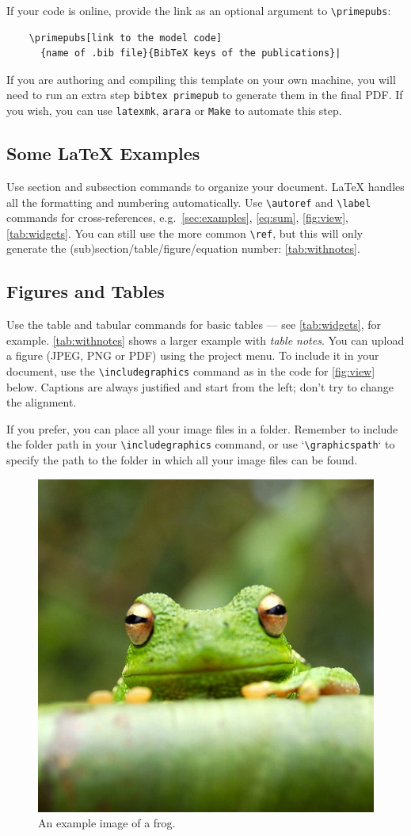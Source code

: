 \documentclass[fleqn,10pt]{physiome}
\begin{document}
If your code is online, provide the link as an optional argument to \verb|\primepubs|:

\begin{verbatim}
    \primepubs[link to the model code]
      {name of .bib file}{BibTeX keys of the publications}|
\end{verbatim}

If you are authoring and compiling this template on your own machine, you will need to run an extra step \verb|bibtex primepub| to generate them in the final PDF. If you wish, you can use \texttt{latexmk}, \texttt{arara} or \texttt{Make} to automate this step.

\subsection{Some \LaTeX{} Examples}
\label{sec:examples}

Use section and subsection commands to organize your document. \LaTeX{} handles all the formatting and numbering automatically. Use \verb|\autoref| and \verb|\label| commands for cross-references, e.g.~\autoref{sec:examples}, \autoref{eq:sum}, \autoref{fig:view}, \autoref{tab:widgets}. You can still use the more common \verb|\ref|, but this will only generate the (sub)section/table/figure/equation number: \ref{tab:withnotes}.

\subsection{Figures and Tables}

Use the table and tabular commands for basic tables --- see \autoref{tab:widgets}, for example. \autoref{tab:withnotes} shows a larger example with \emph{table notes}. You can upload a figure (JPEG, PNG or PDF) using the project menu. To include it in your document, use the \verb|\includegraphics| command as in the code for \autoref{fig:view} below. Captions are always justified and start from the left; don't try to change the alignment.

If you prefer, you can place all your image files in a folder. Remember to include the folder path in your \verb|\includegraphics| command, or use `\verb|\graphicspath|` to specify the path to the folder in which all your image files can be found.

\begin{figure}[ht]\centering
\includegraphics[width=0.5\linewidth]{frog}
\caption{An example image of a frog.}
\label{fig:view}
\end{figure}
\end{document}
